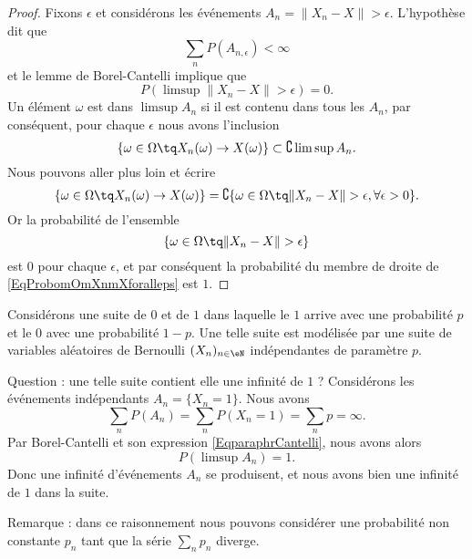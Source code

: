 \begin{proof}
	Fixons \( \epsilon\) et considérons les événements \( A_{n}=\| X_n-X \|>\epsilon\). L'hypothèse dit que
	\begin{equation}
		\sum_nP(A_{n,\epsilon})<\infty
	\end{equation}
	et le lemme de Borel-Cantelli implique que
	\begin{equation}
		P(\limsup\| X_n-X \|>\epsilon)=0.
	\end{equation}
	Un élément \( \omega\) est dans \( \limsup A_n\) si il est contenu dans tous les \( A_n\), par conséquent, pour chaque \( \epsilon\) nous avons l'inclusion
	\begin{equation}
		\{ \omega\in\Omega\tq X_n(\omega)\to X(\omega) \}\subset\complement\limsup A_n.
	\end{equation}
	Nous pouvons aller plus loin et écrire
	\begin{equation}        \label{EqProbomOmXnmXforalleps}
		\{ \omega\in\Omega\tq X_n(\omega)\to X(\omega) \}=\complement\{ \omega\in\Omega\tq \| X_n-X \|>\epsilon,\forall\epsilon>0 \}.
	\end{equation}
	Or la probabilité de l'ensemble
	\begin{equation}
		\{ \omega\in\Omega\tq\| X_n-X \|>\epsilon \}
	\end{equation}
	est \( 0\) pour chaque \( \epsilon\), et par conséquent la probabilité du membre de droite de \eqref{EqProbomOmXnmXforalleps} est \( 1\).
\end{proof}

\begin{example}
	Considérons une suite de \( 0\) et de \( 1\) dans laquelle le \( 1\) arrive avec une probabilité \( p\) et le \( 0\) avec une probabilité \( 1-p\). Une telle suite est modélisée par une suite de variables aléatoires de Bernoulli \( (X_n)_{n\in\eN}\) indépendantes de paramètre \( p\).

	Question : une telle suite contient elle une infinité de \( 1\) ? Considérons les événements indépendants \( A_n=\{ X_n=1 \}\). Nous avons
	\begin{equation}
		\sum_n P(A_n)=\sum_nP(X_n=1)=\sum_np=\infty.
	\end{equation}
	Par Borel-Cantelli et son expression \eqref{EqparaphrCantelli}, nous avons alors
	\begin{equation}
		P(\limsup A_n)=1.
	\end{equation}
	Donc une infinité d'événements \( A_n\) se produisent, et nous avons bien une infinité de \( 1\) dans la suite.

	Remarque : dans ce raisonnement nous pouvons considérer une probabilité non constante \( p_n\) tant que la série \( \sum_np_n\) diverge.
\end{example}


